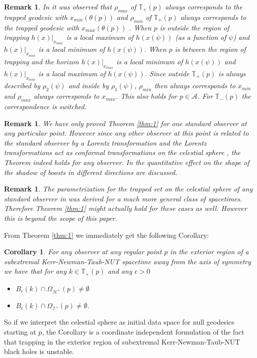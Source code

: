 \documentclass[reqno]{amsart}
\numberwithin{equation}{section}
\newcommand{\scri}{\mathcal{I}}
\theoremstyle{plain}
\newtheorem{cor}[thm]{Corollary}
\newtheorem{remark}[thm]{Remark}
\theoremstyle{definition}
\begin{document}
\begin{remark}
In \cite{grenzebach_photon_2014} it was observed that $\rho_{max}$ of $\mathbb{T}_+(p) $ always corresponds to the trapped geodesic with $x_{min}(\theta(p))$ and $\rho_{min}$ of $\mathbb{T}_+(p) $ always corresponds to the trapped geodesic with $x_{max}(\theta(p))$ . When $p$ is outside the region of trapping $h(x)|_{x_{max}}$ is a local maximum of $h(x(\psi))$ (as a function of $\psi$) and  $h(x)|_{x_{min}}$ is a local minimum of $h(x(\psi))$. When $p$ is between the region of trapping and the horizon $h(x)|_{x_{max}}$ is a local minimum of $h(x(\psi))$ and  $h(x)|_{x_{min}}$ is a local maximum of $h(x(\psi))$. Since outside $\mathbb{T}_+(p) $ is always described by $\rho_2(\psi)$ and inside by $\rho_1(\psi)$, $\rho_{min}$ then always corresponds to $x_{min}$ and $\rho_{max}$ always corresponds to $x_{max}$. This also holds for $p\in\mathcal{A}$. For $\mathbb{T}_-(p) $ the correspondence is switched.
\end{remark}
\begin{remark}
We have only proved Theorem \ref{thm:1} for one standard observer at any particular point. However since any other observer at this point is related to the standard observer by a Lorentz transformation and the Lorentz transformations act as conformal transformations on the celestial sphere \cite[p.14]{penrose_spinors_1987}, the Theorem indeed holds for any observer. In \cite{grenzebach_aberrational_2015} the quantitative effect on the shape of the shadow of boosts in different directions are discussed.
\end{remark}
\begin{remark}
The parametrization for the trapped set on the celestial sphere of any standard observer in \cite{grenzebach_photon_2014,grenzebach_photon_2015} was derived for a much more general class of spacetimes. Therefore  Theorem \ref{thm:1} might actually hold for these cases as well. However this is beyond the scope of this paper.
\end{remark}
From Theorem \ref{thm:1} we immediately get the following Corollary:
\begin{cor}
For any observer at any regular point $p$ in the exterior region of a subextremal Kerr-Newman-Taub-NUT spacetime away from the axis of symmetry we have that for any $k\in \mathbb{T}_+(p)$ and any $\epsilon>0$
\begin{itemize}[noitemsep]
\item $B_\epsilon(k)\cap \Omega_{\mathcal{H}^+}(p)\neq \emptyset$
\item $B_\epsilon(k)\cap \Omega_{\scri^+}(p)\neq \emptyset$.
\end{itemize}
\end{cor}
\noindent So if we interpret the celestial sphere as initial data space for null geodesics starting at $p$, the Corollary is a coordinate independent formulation of the fact that trapping in the exterior region of subextremal Kerr-Newman-Taub-NUT black holes is unstable.\\
\end{document}
